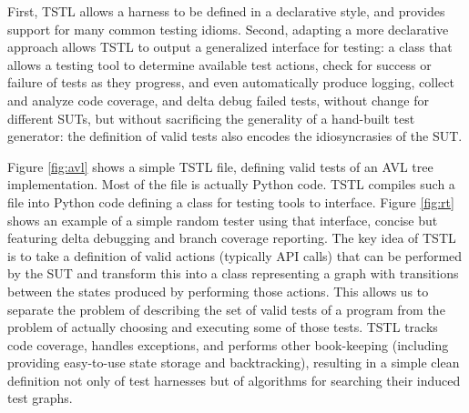 \documentclass{sig-alternate}
\begin{document}
First, TSTL allows a harness to be defined in a declarative style, and
provides support for many common testing idioms.  Second, adapting a
more declarative approach allows TSTL to output a generalized
interface for testing: a class that allows a testing tool to determine
available test actions, check for success or failure of tests as they
progress, and even automatically produce logging, collect and analyze
code coverage, and delta debug failed tests, without change for
different SUTs, but without sacrificing the generality of a hand-built
test generator: the definition of valid tests also encodes the
idiosyncrasies of the SUT.

Figure \ref{fig:avl} shows a simple TSTL file, defining valid tests of
an AVL tree implementation.  Most of the file is actually Python code.
TSTL compiles such a file into Python code defining a class for
testing tools to interface.  Figure \ref{fig:rt} shows an example of a
simple random tester using that interface, concise but featuring delta
debugging \cite{DD} and branch coverage reporting.  The key idea of TSTL is to
take a definition of valid actions (typically API calls) that can
be performed by the SUT and transform this into a class representing a
graph with transitions between the states produced by performing those
actions.  This allows us to separate the problem of describing the set
of valid tests of a program from the problem of actually choosing and
executing some of those tests.  
TSTL tracks code coverage, handles exceptions, and performs
other book-keeping (including providing easy-to-use state storage and
backtracking), resulting in a simple clean definition not only of
test harnesses but of algorithms for searching their induced test graphs.
\end{document}
